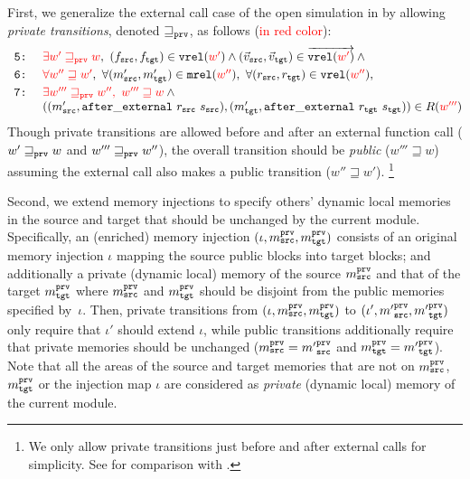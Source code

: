 First, we generalize the external call case of the open simulation in 
by allowing \emph{private transitions}, denoted $\sqsupseteq_{\texttt{prv}}$,
as follows (\textcolor{red}{in red color}):
\[
\begin{array}{@{}l@{}}
\texttt{ 5:}~\quad \textcolor{red}{\exists w' \sqsupseteq_\weak w},~ (f_\src,f_\tgt)\in \texttt{vrel}(\textcolor{red}{w'}) \land (\vec{v}_\src,\vec{v}_\tgt) \in \overrightarrow{\texttt{vrel}(\textcolor{red}{w'})} \land{} \\[1mm]
\texttt{ 6:}~\quad \textcolor{red}{\forall w'' \sqsupseteq w'},~\forall (\memsrc',\memtgt')\in\texttt{mrel}(\textcolor{red}{w''}),~ \forall (r_\src,r_\tgt)\in \texttt{vrel}(\textcolor{red}{w''}),\\[1mm]
\texttt{ 7:}~\quad \textcolor{red}{\exists w''' \sqsupseteq_\weak w'',~ w''' \sqsupseteq w} \land {} \\
\phantom{\texttt{ 7:}}~\quad ((\memsrc',\mathtt{after\_external}~r_\src~\stsrc),(\memtgt',\mathtt{after\_external}~r_\tgt~\sttgt))\in R(\textcolor{red}{w'''})
\end{array}
\]
Though private transitions are allowed before and after an external function call (\ie
$w' \sqsupseteq_{\texttt{prv}} w$ and $w''' \sqsupseteq_{\texttt{prv}} w''$),
the overall transition should be \emph{public} (\ie $w''' \sqsupseteq w$)
assuming the external call also makes a public transition (\ie $w'' \sqsupseteq w'$).%
\footnote{We only allow private transitions just before and after external calls for simplicity.
See  for comparison with \cite{DBLP:conf/icfp/DreyerNB10,pb}.}

Second, we extend memory injections to specify others' dynamic local
memories in the source and target that should be unchanged by the current module.
Specifically, an (enriched) memory injection $(\iota, m^{\texttt{prv}}_{\texttt{src}}, m^{\texttt{prv}}_{\texttt{tgt}})$
consists of an original memory injection $\iota$ mapping the source public blocks into target blocks; and additionally
a private (\ie dynamic local) memory of the source $m^{\texttt{prv}}_{\texttt{src}}$ and that of the target $m^{\texttt{prv}}_{\texttt{tgt}}$
where $m^{\texttt{prv}}_{\texttt{src}}$ and $m^{\texttt{prv}}_{\texttt{tgt}}$ should be disjoint from the public memories specified by~$\iota$.
Then, private transitions from $(\iota, m^{\texttt{prv}}_{\texttt{src}}, m^{\texttt{prv}}_{\texttt{tgt}})$ to
$(\iota', {m'}^{\texttt{prv}}_{\texttt{src}}, {m'}^{\texttt{prv}}_{\texttt{tgt}})$ only require that $\iota'$ should extend $\iota$,
while public transitions additionally require that private memories should be unchanged
(\ie $m^{\texttt{prv}}_{\texttt{src}} = {m'}^{\texttt{prv}}_{\texttt{src}}$ and $m^{\texttt{prv}}_{\texttt{tgt}} = {m'}^{\texttt{prv}}_{\texttt{tgt}}$).
Note that all the areas of the source and target memories that are not on $m^{\texttt{prv}}_{\texttt{src}}$, $m^{\texttt{prv}}_{\texttt{tgt}}$ or the injection map $\iota$
are considered as \emph{private} (\ie dynamic local) memory of the current module.

